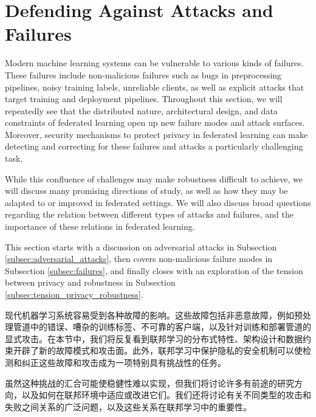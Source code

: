 
\section{Defending Against Attacks and Failures}
\label{sec:robust}

Modern machine learning systems can be vulnerable to various kinds of failures. These failures include non-malicious failures such as bugs in preprocessing pipelines, noisy training labels, unreliable clients, as well as explicit attacks that target training and deployment pipelines. Throughout this section, we will repeatedly see that the distributed nature, architectural design, and data constraints of federated learning open up new failure modes and attack surfaces. Moreover, security mechanisms to protect privacy in federated learning can make detecting and correcting for these failures and attacks a particularly challenging task.

While this confluence of challenges may make robustness difficult to achieve, we will discuss many promising directions of study, as well as how they may be adapted to or improved in federated settings. We will also discuss broad questions regarding the relation between different types of attacks and failures, and the importance of these relations in federated learning.

This section starts with a discussion on adversarial attacks in Subsection \ref{subsec:adversarial_attacks}, then covers non-malicious failure modes in Subsection \ref{subsec:failures}, and finally closes with an exploration of the tension between privacy and robustness in Subsection \ref{subsec:tension_privacy_robustness}.


现代机器学习系统容易受到各种故障的影响。这些故障包括非恶意故障，例如预处理管道中的错误、嘈杂的训练标签、不可靠的客户端，以及针对训练和部署管道的显式攻击。在本节中，我们将反复看到联邦学习的分布式特性、架构设计和数据约束开辟了新的故障模式和攻击面。此外，联邦学习中保护隐私的安全机制可以使检测和纠正这些故障和攻击成为一项特别具有挑战性的任务。

虽然这种挑战的汇合可能使稳健性难以实现，但我们将讨论许多有前途的研究方向，以及如何在联邦环境中适应或改进它们。我们还将讨论有关不同类型的攻击和失败之间关系的广泛问题，以及这些关系在联邦学习中的重要性。

